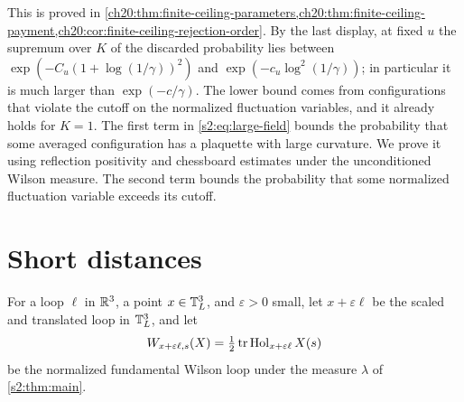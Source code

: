 This is proved in \cref{ch20:thm:finite-ceiling-parameters,ch20:thm:finite-ceiling-payment,ch20:cor:finite-ceiling-rejection-order}. By the last display, at fixed $u$ the supremum over $K$ of the discarded probability lies between $\exp(-C_u(1+\log(1/\gamma))^2)$ and $\exp(-c_u\log^2(1/\gamma))$; in particular it is much larger than $\exp(-c/\gamma)$. The lower bound comes from configurations that violate the cutoff on the normalized fluctuation variables, and it already holds for $K=1$. The first term in \eqref{s2:eq:large-field} bounds the probability that some averaged configuration has a plaquette with large curvature. We prove it using reflection positivity and chessboard estimates under the unconditioned Wilson measure. The second term bounds the probability that some normalized fluctuation variable exceeds its cutoff.

\section{Short distances}\label{s2:short}

For a loop $\ell$ in $\mathbb R^3$, a point $x\in\mathbb T_L^3$, and $\varepsilon>0$ small, let $x+\varepsilon\ell$ be the scaled and translated loop in $\mathbb T_L^3$, and let
\[
 W_{x+\varepsilon\ell,s}(X)=\tfrac12\operatorname{tr}\operatorname{Hol}_{x+\varepsilon\ell}X(s)
\]
be the normalized fundamental Wilson loop under the measure $\lambda$ of \cref{s2:thm:main}.

